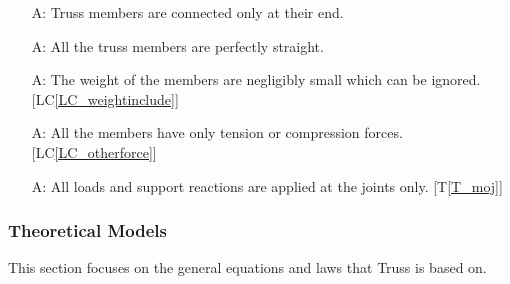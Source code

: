 \documentclass[12pt]{article}
\newcommand{\tref}[1]{T\ref{#1}}
\newcounter{assumpnum} %
\newcommand{\lcref}[1]{LC\ref{#1}}
\begin{document}
\begin{itemize}
	
	\item[A\refstepcounter{assumpnum}\theassumpnum \label{A_connectatend}:]
	Truss members are connected only at their end. 
	
\end{itemize}

\begin{itemize}
	
	\item[A\refstepcounter{assumpnum}\theassumpnum \label{A_straight}:]
	All the truss members are perfectly straight. 
	
\end{itemize}

\begin{itemize}
	
	\item[A\refstepcounter{assumpnum}\theassumpnum \label{A_weightig}:]
	The weight of the members are negligibly small which can be ignored. 
	[\lcref{LC_weightinclude}]
	
\end{itemize}

\begin{itemize}
	
	\item[A\refstepcounter{assumpnum}\theassumpnum \label{A_twoforce}:]
	All the members have only tension or compression forces. 
	[\lcref{LC_otherforce}]
	
\end{itemize}

\begin{itemize}
	
	\item[A\refstepcounter{assumpnum}\theassumpnum \label{A_reactionjoint}:]
	All loads and support reactions are applied at the joints only. 
	[\tref{T_moj}] 
	
\end{itemize}

\subsubsection{Theoretical Models}\label{sec_theoretical}

This section focuses on the general equations and laws that Truss is based
on.  
~\newline
\end{document}
